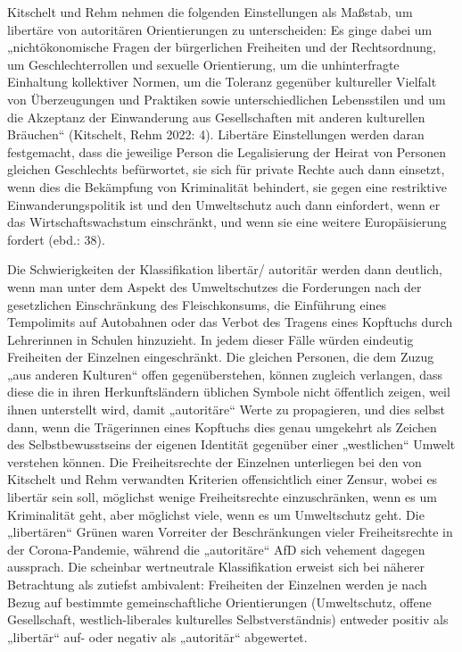 \begin{multicols*}{2}
    Kitschelt und Rehm nehmen die folgenden Einstellungen als Maßstab, um libertäre von autoritären Orientierungen zu unterscheiden: Es ginge dabei um „nichtökonomische Fragen der bürgerlichen Freiheiten und der Rechtsordnung, um Geschlechterrollen und sexuelle Orientierung, um die unhinterfragte Einhaltung kollektiver Normen,  um die Toleranz gegenüber kultureller Vielfalt von Überzeugungen und Praktiken sowie unterschiedlichen Lebensstilen und um die Akzeptanz der Einwanderung aus Gesellschaften mit anderen kulturellen Bräuchen“ (Kitschelt, Rehm 2022: 4). Libertäre Einstellungen werden daran festgemacht, dass die jeweilige Person die Legalisierung der Heirat von Personen gleichen Geschlechts befürwortet, sie sich für private Rechte auch dann einsetzt, wenn dies die Bekämpfung von Kriminalität behindert, sie gegen eine restriktive Einwanderungspolitik ist und den Umweltschutz auch dann einfordert, wenn er das Wirtschaftswachstum einschränkt, und wenn sie eine weitere Europäisierung fordert (ebd.: 38). 

Die Schwierigkeiten der Klassifikation libertär/ autoritär werden dann deutlich, wenn man unter dem Aspekt des Umweltschutzes die Forderungen nach der gesetzlichen Einschränkung des Fleischkonsums, die Einführung eines Tempolimits auf Autobahnen oder das Verbot des Tragens eines Kopftuchs durch Lehrerinnen in Schulen hinzuzieht. In jedem dieser Fälle würden eindeutig Freiheiten der Einzelnen eingeschränkt. Die gleichen Personen, die dem Zuzug „aus anderen Kulturen“ offen gegenüberstehen, können zugleich verlangen, dass diese die in ihren Herkunftsländern üblichen Symbole nicht öffentlich zeigen, weil ihnen unterstellt wird, damit „autoritäre“ Werte zu propagieren, und dies selbst dann, wenn die Trägerinnen eines Kopftuchs dies genau umgekehrt als Zeichen des Selbstbewusstseins der eigenen Identität gegenüber einer „westlichen“ Umwelt verstehen können. Die Freiheitsrechte der Einzelnen unterliegen bei den von Kitschelt und Rehm verwandten Kriterien offensichtlich einer Zensur, wobei es libertär sein soll, möglichst wenige Freiheitsrechte einzuschränken, wenn es um Kriminalität geht, aber möglichst viele, wenn es um Umweltschutz geht. Die „libertären“ Grünen waren Vorreiter der Beschränkungen vieler Freiheitsrechte in der Corona-Pandemie, während die „autoritäre“ AfD sich vehement dagegen aussprach. Die scheinbar wertneutrale Klassifikation erweist sich bei näherer Betrachtung als zutiefst ambivalent: Freiheiten der Einzelnen werden je nach Bezug auf bestimmte gemeinschaftliche Orientierungen (Umweltschutz, offene Gesellschaft, westlich-liberales kulturelles Selbstverständnis) entweder positiv als „libertär“ auf- oder negativ als „autoritär“ abgewertet.


\end{multicols*}
